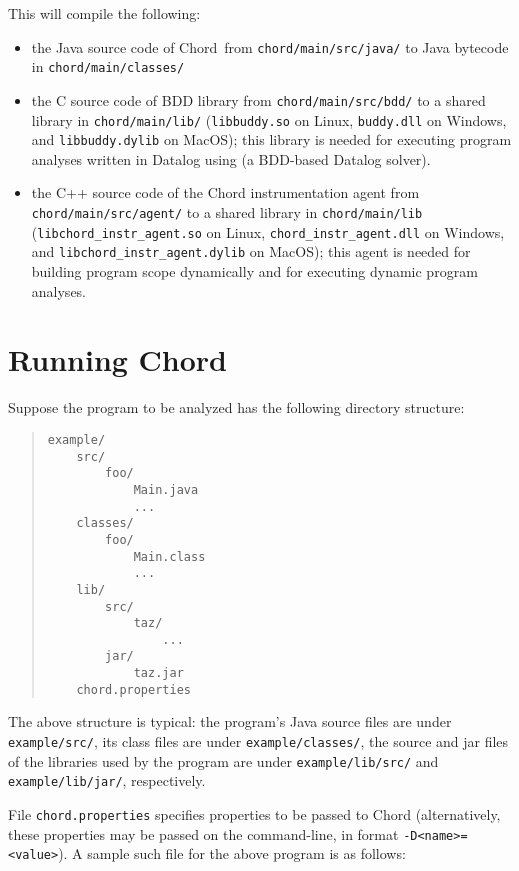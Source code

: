 \documentclass{article}
\providecommand\Chord{Chord}
\begin{document}
This will compile the following:
\begin{itemize}
\item
the Java source code of \Chord\ from {\tt chord/main/src/java/} to Java bytecode in {\tt chord/main/classes/}
\item
the C source code of BDD library  from {\tt chord/main/src/bdd/}
to a shared library in {\tt chord/main/lib/} ({\tt libbuddy.so} on Linux, {\tt buddy.dll} on Windows, and {\tt libbuddy.dylib} on MacOS);
this library is needed for executing program analyses written in Datalog using
 (a BDD-based Datalog solver).
\item
the C++ source code of the Chord instrumentation agent from {\tt chord/main/src/agent/} to a shared
library in {\tt chord/main/lib} ({\tt libchord\_instr\_agent.so} on Linux, {\tt chord\_instr\_agent.dll} on Windows,
and {\tt libchord\_instr\_agent.dylib} on MacOS); this agent is needed for building program scope dynamically
and for executing dynamic program analyses.
\end{itemize}

\texonly{\newpage}
\section{Running Chord}

Suppose the program to be analyzed has the following directory structure:

\begin{quote}
\begin{verbatim}
example/
    src/
        foo/
            Main.java
            ...
    classes/
        foo/
            Main.class
            ...
    lib/
        src/
            taz/
                ...
        jar/
            taz.jar
    chord.properties
\end{verbatim}
\end{quote}

The above structure is typical: the program's Java source files are under \verb+example/src/+,
its class files are under \verb+example/classes/+, the source and jar files of the libraries
used by the program are under \verb+example/lib/src/+ and \verb+example/lib/jar/+, respectively.

File \verb+chord.properties+ specifies properties to be passed to Chord (alternatively,
these properties may be passed on the command-line, in format \verb+-D<name>=<value>+).
A sample such file for the above program is as follows:
\end{document}
